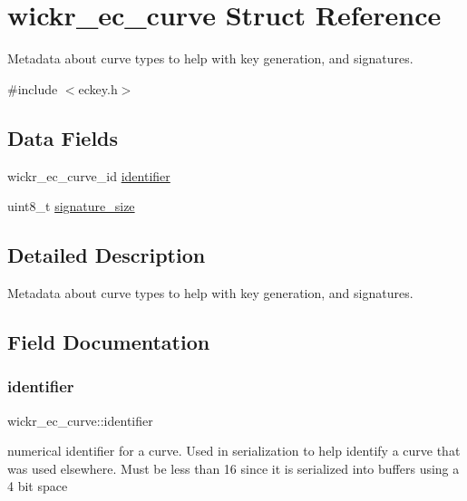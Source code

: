 \hypertarget{structwickr__ec__curve}{}\section{wickr\+\_\+ec\+\_\+curve Struct Reference}
\label{structwickr__ec__curve}


Metadata about curve types to help with key generation, and signatures.  




{\ttfamily \#include $<$eckey.\+h$>$}

\subsection*{Data Fields}
\begin{DoxyCompactItemize}
\item 
wickr\+\_\+ec\+\_\+curve\+\_\+id \mbox{\hyperlink{structwickr__ec__curve_a6a3db9bd65c2b95edec61e0b48760bf4}{identifier}}
\item 
uint8\+\_\+t \mbox{\hyperlink{structwickr__ec__curve_ab77300e816beace29e40cf8e643a5070}{signature\+\_\+size}}
\end{DoxyCompactItemize}


\subsection{Detailed Description}
Metadata about curve types to help with key generation, and signatures. 

\subsection{Field Documentation}
\mbox{\label{structwickr__ec__curve_a6a3db9bd65c2b95edec61e0b48760bf4}} 
\subsubsection{\texorpdfstring{identifier}{identifier}}
{\footnotesize\ttfamily wickr\+\_\+ec\+\_\+curve\+::identifier}

numerical identifier for a curve. Used in serialization to help identify a curve that was used elsewhere. Must be less than 16 since it is serialized into buffers using a 4 bit space \mbox{\label{structwickr__ec__curve_ab77300e816beace29e40cf8e643a5070}} 
